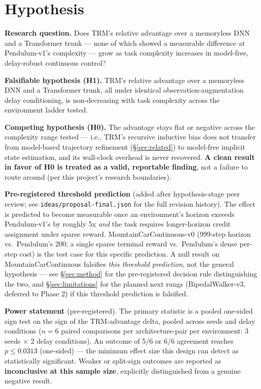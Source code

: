 \documentclass[11pt]{article}
\begin{document}
\section{Hypothesis}

\textbf{Research question.} Does TRM's relative advantage over a memoryless DNN and a Transformer trunk --- none of which showed a measurable difference at Pendulum-v1's complexity --- grow as task complexity increases in model-free, delay-robust continuous control?

\textbf{Falsifiable hypothesis (H1).} TRM's relative advantage over a memoryless DNN and a Transformer trunk, all under identical observation-augmentation delay conditioning, is non-decreasing with task complexity across the environment ladder tested.

\textbf{Competing hypothesis (H0).} The advantage stays flat or negative across the complexity range tested --- i.e., TRM's recursive inductive bias does not transfer from model-based trajectory refinement (\S\ref{sec:related}) to model-free implicit state estimation, and its wall-clock overhead is never recovered. \textbf{A clean result in favor of H0 is treated as a valid, reportable finding}, not a failure to route around (per this project's research boundaries).

\textbf{Pre-registered threshold prediction} (added after hypothesis-stage peer review; see \texttt{ideas/proposal-final.json} for the full revision history). The effect is predicted to become measurable once an environment's horizon exceeds Pendulum-v1's by roughly 5x \emph{and} the task requires longer-horizon credit assignment under sparse reward. MountainCarContinuous-v0 (999-step horizon vs.\ Pendulum's 200; a single sparse terminal reward vs.\ Pendulum's dense per-step cost) is the test case for this specific prediction. A null result on MountainCarContinuous falsifies \emph{this threshold prediction}, not the general hypothesis --- see \S\ref{sec:method} for the pre-registered decision rule distinguishing the two, and \S\ref{sec:limitations} for the planned next rungs (BipedalWalker-v3, deferred to Phase 2) if this threshold prediction is falsified.

\textbf{Power statement} (pre-registered). The primary statistic is a pooled one-sided sign test on the sign of the TRM-advantage delta, pooled across seeds and delay conditions ($n=6$ paired comparisons per architecture-pair per environment: 3 seeds $\times$ 2 delay conditions). An outcome of 5/6 or 6/6 agreement reaches $p \le 0.0313$ (one-sided) --- the minimum effect size this design can detect as statistically significant. Weaker or split-sign outcomes are reported as \textbf{inconclusive at this sample size}, explicitly distinguished from a genuine negative result.
\end{document}
